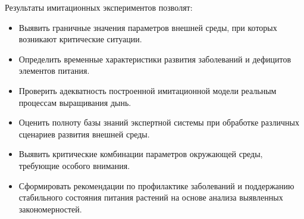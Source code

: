 Результаты имитационных экспериментов позволят:
\begin{itemize}
    \item Выявить граничные значения параметров внешней среды, при которых возникают критические ситуации.
    \item Определить временные характеристики развития заболеваний и дефицитов элементов питания.
    \item Проверить адекватность построенной имитационной модели реальным процессам выращивания дынь.
    \item Оценить полноту базы знаний экспертной системы при обработке различных сценариев развития внешней среды.
    \item Выявить критические комбинации параметров окружающей среды, требующие особого внимания.
    \item Сформировать рекомендации по профилактике заболеваний и поддержанию стабильного состояния питания растений на основе анализа выявленных закономерностей.
\end{itemize}
